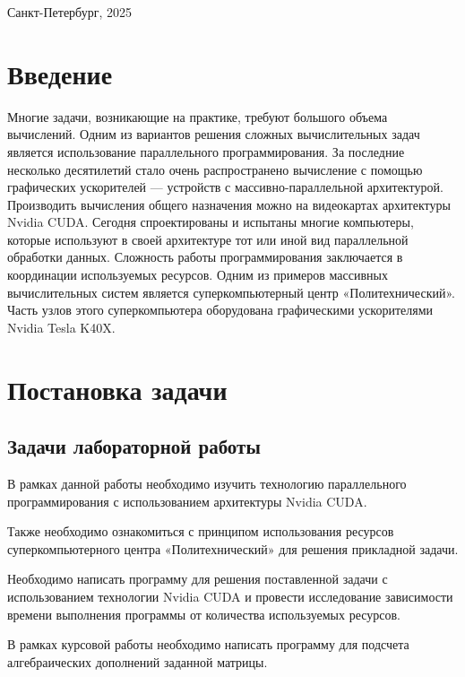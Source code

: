 \documentclass[a4paper, final]{article}
\begin{document}
\begin{center} \small{Санкт-Петербург, 2025} \end{center}
\thispagestyle{empty} 

\newpage
\tableofcontents
\newpage
\section*{Введение}
Многие задачи, возникающие на практике, требуют большого объема вычислений. Одним из вариантов решения сложных вычислительных задач является использование
параллельного программирования.
За последние несколько десятилетий стало очень распространено вычисление с помощью графических ускорителей — устройств с массивно-параллельной архитектурой.
Производить вычисления общего назначения можно на видеокартах архитектуры Nvidia
CUDA.
Сегодня спроектированы и испытаны многие компьютеры, которые используют в своей
архитектуре тот или иной вид параллельной обработки данных. Сложность работы
программирования заключается в координации используемых ресурсов.
Одним из примеров массивных вычислительных систем является суперкомпьютерный
центр «Политехнический». Часть узлов этого суперкомпьютера оборудована графическими ускорителями Nvidia Tesla K40X.


\newpage
\section{Постановка задачи}

\subsection{Задачи лабораторной работы}

В рамках данной работы необходимо изучить технологию параллельного программирования с использованием архитектуры Nvidia CUDA.

Также необходимо ознакомиться с принципом использования ресурсов суперкомпьютерного центра «Политехнический» для решения прикладной задачи.

Необходимо написать программу для решения поставленной задачи с использованием
технологии Nvidia CUDA и провести исследование зависимости времени выполнения
программы от количества используемых ресурсов.

В рамках курсовой работы необходимо написать программу для подсчета алгебраических дополнений заданной матрицы. 


\newpage
\end{document}
